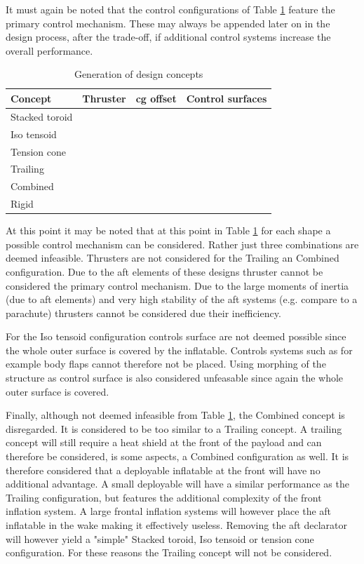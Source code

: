 It must again be noted that the control configurations of Table \ref{tab:designconcepts} feature the primary control mechanism. These may always be appended later on in the design process, after the trade-off, if additional control systems increase the overall performance. 

\begin{table}[H]
	\caption{Generation of design concepts}
	\label{tab:designconcepts}
		\begin{tabular}{|p{}|p{}|p{}|p{}|} \hline 
			\textbf{Concept} & \textbf{Thruster}	& \textbf{\gls{cg} offset} &  \textbf{Control surfaces} \\ \hline \hline
			Stacked toroid   & \cmark	& \cmark &  \cmark \\ \hline
			Iso tensoid		 & \cmark	& \cmark &  \xmark\\ \hline
			Tension cone	 & \cmark	& \cmark &  \cmark \\ \hline
			Trailing 		 & \xmark	& \cmark &  \cmark \\ \hline
			Combined 		 & \xmark	& \cmark &  \cmark \\ \hline
			Rigid  		   	 & \cmark	& \cmark &  \cmark \\ \hline
		\end{tabular}
\end{table}

At this point it may be noted that at this point in Table \ref{tab:designconcepts} for each shape a possible control mechanism can be considered. Rather just three combinations are deemed infeasible. Thrusters are not considered for the Trailing an Combined configuration. Due to the aft elements of these designs thruster cannot be considered the primary control mechanism. Due to the large moments of inertia (due to aft elements) and very high stability of the aft systems (e.g. compare to a parachute) thrusters cannot be considered due their inefficiency. 

For the Iso tensoid configuration controls surface are not deemed possible since the whole outer surface is covered by the inflatable. Controls systems such as for example body flaps cannot therefore not be placed. Using morphing of the structure as control surface is also considered unfeasable since again the whole outer surface is covered. 

Finally, although not deemed infeasible from Table \ref{tab:designconcepts}, the Combined concept is disregarded. It is considered to be too similar to a Trailing concept. A trailing concept will still require a heat shield at the front of the payload and can therefore be considered, is some aspects, a Combined configuration as well. It is therefore considered that a deployable inflatable at the front will have no additional advantage. A small deployable will have a similar performance as the Trailing configuration, but features the additional complexity of the front inflation system. A large frontal inflation systems will however place the aft inflatable in the wake making it effectively useless. Removing the aft declarator will however yield a "simple" Stacked toroid, Iso tensoid or tension cone configuration. For these reasons the Trailing concept will not be considered. 


